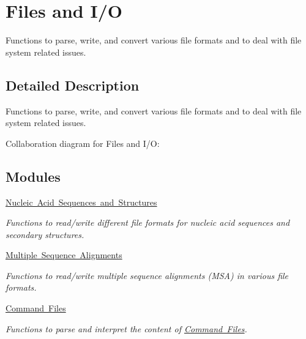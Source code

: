 \hypertarget{group__file__utils}{}\section{Files and I/O}
\label{group__file__utils}


Functions to parse, write, and convert various file formats and to deal with file system related issues.  




\subsection{Detailed Description}
Functions to parse, write, and convert various file formats and to deal with file system related issues. 

Collaboration diagram for Files and I/O\+:
\subsection*{Modules}
\begin{DoxyCompactItemize}
\item 
\mbox{\hyperlink{group__file__formats}{Nucleic Acid Sequences and Structures}}
\begin{DoxyCompactList}\small\item\em Functions to read/write different file formats for nucleic acid sequences and secondary structures. \end{DoxyCompactList}\item 
\mbox{\hyperlink{group__file__formats__msa}{Multiple Sequence Alignments}}
\begin{DoxyCompactList}\small\item\em Functions to read/write multiple sequence alignments (M\+SA) in various file formats. \end{DoxyCompactList}\item 
\mbox{\hyperlink{group__command__files}{Command Files}}
\begin{DoxyCompactList}\small\item\em Functions to parse and interpret the content of \mbox{\hyperlink{file_formats_constraint-formats-file}{Command Files}}. \end{DoxyCompactList}\end{DoxyCompactItemize}
